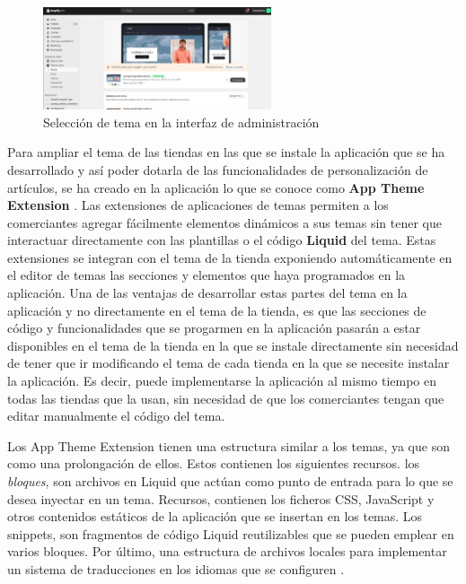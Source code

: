 \documentclass[11pt]{article}
\begin{document}
\begin{figure}[H]
    \centering
    \includegraphics[width=0.6\textwidth]{imagenes/Interfaz de adminsitración elección de tema.png}
    \caption{\label{fig:2}Selección de tema en la interfaz de administración}
    \vspace{\fill}
\end{figure}

Para ampliar el tema de las tiendas en las que se instale la aplicación que se ha desarrollado y así poder dotarla de las funcionalidades de personalización de 
artículos, se ha creado en la aplicación lo que se conoce como \textbf{App Theme Extension} \cite{theme-app-extension}. Las extensiones de aplicaciones de temas permiten a los comerciantes
agregar fácilmente elementos dinámicos a sus temas sin tener que interactuar directamente con las plantillas o el código \textbf{Liquid} del tema. Estas extensiones
se integran con el tema de la tienda exponiendo automáticamente en el editor de temas las secciones y elementos que haya programados en la aplicación. \cite{shopify-dev}
Una de las ventajas de desarrollar estas partes del tema en la aplicación y no directamente en el tema de la tienda, es que las secciones de código y funcionalidades
que se progarmen en la aplicación pasarán a estar disponibles en el tema de la tienda en la que se instale directamente sin necesidad de tener que ir modificando el tema
de cada tienda en la que se necesite instalar la aplicación. Es decir, puede implementarse la aplicación al mismo tiempo en todas las tiendas que la usan,
sin necesidad de que los comerciantes tengan que editar manualmente el código del tema.

Los App Theme Extension tienen una estructura similar a los temas, ya que son como una prolongación de ellos. Estos contienen los siguientes recursos. 
los \textit{bloques}, son archivos en Liquid que actúan como punto de entrada para lo que se desea inyectar en un tema.
Recursos, contienen los ficheros CSS, JavaScript y otros contenidos estáticos de la aplicación que se insertan en los temas.
Los snippets, son fragmentos de código Liquid reutilizables que se pueden emplear en varios bloques. Por último, una estructura de archivos locales
para implementar un sistema de traducciones en los idiomas que se configuren \cite{shopify-dev}. 
\end{document}
